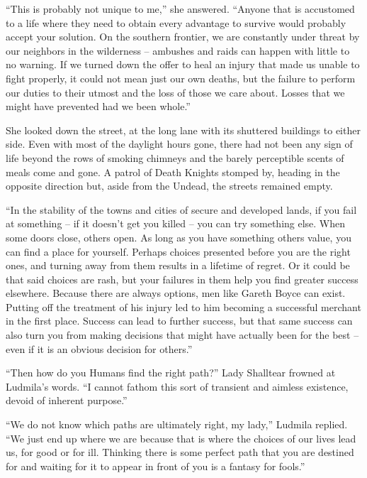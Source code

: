  

“This is probably not unique to me,” she answered. “Anyone that is accustomed to a life where they need to obtain every advantage to survive would probably accept your solution. On the southern frontier, we are constantly under threat by our neighbors in the wilderness – ambushes and raids can happen with little to no warning. If we turned down the offer to heal an injury that made us unable to fight properly, it could not mean just our own deaths, but the failure to perform our duties to their utmost and the loss of those we care about. Losses that we might have prevented had we been whole.”

 

She looked down the street, at the long lane with its shuttered buildings to either side. Even with most of the daylight hours gone, there had not been any sign of life beyond the rows of smoking chimneys and the barely perceptible scents of meals come and gone. A patrol of Death Knights stomped by, heading in the opposite direction but, aside from the Undead, the streets remained empty.

 

“In the stability of the towns and cities of secure and developed lands, if you fail at something – if it doesn’t get you killed – you can try something else. When some doors close, others open. As long as you have something others value, you can find a place for yourself. Perhaps choices presented before you are the right ones, and turning away from them results in a lifetime of regret. Or it could be that said choices are rash, but your failures in them help you find greater success elsewhere. Because there are always options, men like Gareth Boyce can exist. Putting off the treatment of his injury led to him becoming a successful merchant in the first place. Success can lead to further success, but that same success can also turn you from making decisions that might have actually been for the best – even if it is an obvious decision for others.”

 

“Then how do you Humans find the right path?” Lady Shalltear frowned at Ludmila’s words. “I cannot fathom this sort of transient and aimless existence, devoid of inherent purpose.”

 

“We do not know which paths are ultimately right, my lady,” Ludmila replied. “We just end up where we are because that is where the choices of our lives lead us, for good or for ill. Thinking there is some perfect path that you are destined for and waiting for it to appear in front of you is a fantasy for fools.”

